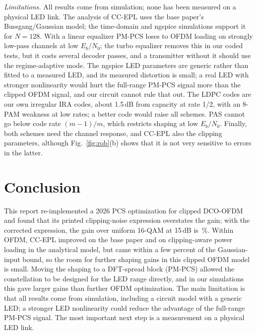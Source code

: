 \documentclass[conference]{IEEEtran}
\begin{document}
\textit{Limitations.} All results come from simulation; none has been measured on a physical LED link. The analysis of CC-EPL uses the base paper's Bussgang/Gaussian model; the time-domain and ngspice simulations support it for $N=128$. With a linear equalizer PM-PCS loses to OFDM loading on strongly low-pass channels at low $E_b/N_0$; the turbo equalizer removes this in our coded tests, but it costs several decoder passes, and a transmitter without it should use the regime-adaptive mode. The ngspice LED parameters are generic rather than fitted to a measured LED, and its measured distortion is small; a real LED with stronger nonlinearity would hurt the full-range PM-PCS signal more than the clipped OFDM signal, and our circuit cannot rule that out. The LDPC codes are our own irregular IRA codes, about 1.5\,dB from capacity at rate 1/2, with an 8-PAM weakness at low rates; a better code would raise all schemes. PAS cannot go below code rate $(m-1)/m$, which restricts shaping at low $E_b/N_0$. Finally, both schemes need the channel response, and CC-EPL also the clipping parameters, although Fig.~\ref{fig:rob}(b) shows that it is not very sensitive to errors in the latter.

\section{Conclusion}
This report re-implemented a 2026 PCS optimization for clipped DCO-OFDM and found that its printed clipping-noise expression overstates the gain; with the corrected expression, the gain over uniform 16-QAM at 15\,dB is \PCSgainCorrect\,\%. Within OFDM, CC-EPL improved on the base paper and on clipping-aware power loading in the analytical model, but came within a few percent of the Gaussian-input bound, so the room for further shaping gains in this clipped OFDM model is small. Moving the shaping to a DFT-spread block (PM-PCS) allowed the constellation to be designed for the LED range directly, and in our simulations this gave larger gains than further OFDM optimization. The main limitation is that all results come from simulation, including a circuit model with a generic LED; a stronger LED nonlinearity could reduce the advantage of the full-range PM-PCS signal. The most important next step is a measurement on a physical LED link.




\end{document}

